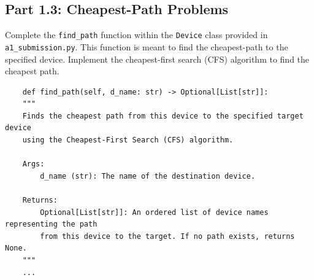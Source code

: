 \documentclass[12pt]{report}
\begin{document}
\subsection*{Part 1.3: Cheapest-Path Problems}
Complete the \texttt{find\_path} function within the \texttt{Device} class provided in \texttt{a1\_submission.py}.
This function is meant to find the cheapest-path to the specified device. Implement the cheapest-first search (CFS) algorithm to find the cheapest path.
\begin{lstlisting}
    def find_path(self, d_name: str) -> Optional[List[str]]:
    """
    Finds the cheapest path from this device to the specified target device 
    using the Cheapest-First Search (CFS) algorithm.

    Args:
        d_name (str): The name of the destination device.

    Returns:
        Optional[List[str]]: An ordered list of device names representing the path 
        from this device to the target. If no path exists, returns None.
    """
    ...
\end{lstlisting}
\end{document}
